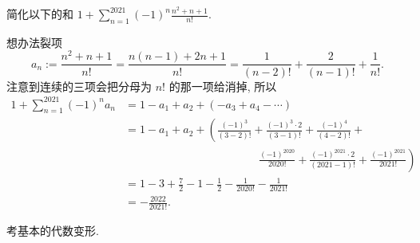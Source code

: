 \begin{prob}
\label{prob:prob-1}
简化以下的和 $1 + \sum_{n=1}^{2021}(-1)^n \frac{n^2 + n + 1}{n!}$.
\end{prob}

\begin{soln}
想办法裂项
\begin{equation}
\label{eq1}
a_n := \frac{n^2 + n + 1}{n!} = \frac{n(n-1) + 2n + 1}{n!}
     = \frac{1}{(n-2)!} + \frac{2}{(n-1)!} + \frac{1}{n!}.
\end{equation}
注意到连续的三项会把分母为 $n!$ 的那一项给消掉, 所以
\begin{align*}
1 + \sum_{n=1}^{2021}(-1)^na_n &= 1 - a_1 + a_2 + (-a_3 + a_4 - \cdots)\\
                               &=1 - a_1 + a_2 + \left(\frac{(-1)^3}{(3-2)!} +
                               \frac{(-1)^3\cdot 2}{(3-1)!} + \frac{(-1)^4}{(4-2)!} +\right.\\
                               &\phantom{=========}\left.\frac{(-1)^{2020}}{2020!} +
                               \frac{(-1)^{2021}\cdot 2}{(2021-1)!} + \frac{(-1)^{2021}}{2021!}\right)\\
                               &= 1 - 3 + \frac{7}{2} - 1 - \frac{1}{2} - \frac{1}{2020!} - \frac{1}{2021!}\\
                               &= \boxed{-\frac{2022}{2021!}.}
\end{align*}
\end{soln}

\begin{rem*}
考基本的代数变形.
\end{rem*}
